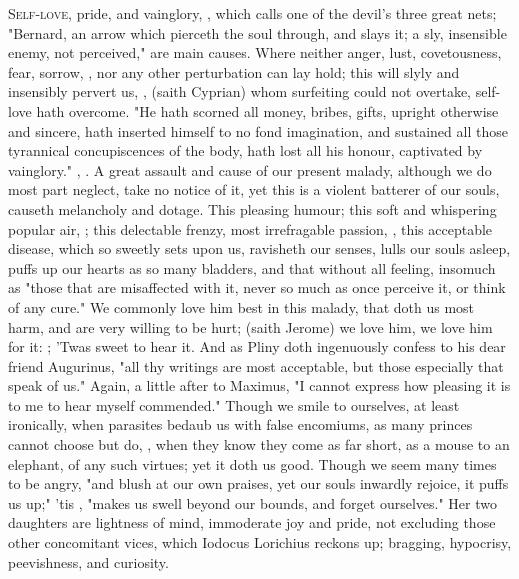 \lettrine{S}{elf-love}, pride, and vainglory, , which \Chrysostom{} calls one of the devil's three great nets;
"Bernard, an arrow which pierceth the soul through, and
slays it; a sly, insensible enemy, not perceived," are main causes. Where
neither anger, lust, covetousness, fear, sorrow, \etc{}, nor any other
perturbation can lay hold; this will slyly and insensibly pervert us, , (saith Cyprian) whom surfeiting could
not overtake, self-love hath overcome. "He hath scorned
all money, bribes, gifts, upright otherwise and sincere, hath inserted himself
to no fond imagination, and sustained all those tyrannical concupiscences of
the body, hath lost all his honour, captivated by vainglory." \Chrysostom{},
 .
A great assault and cause of our present malady, although we do most part
neglect, take no notice of it, yet this is a violent batterer of our souls,
causeth melancholy and dotage. This pleasing humour; this soft and whispering
popular air, ; this delectable frenzy, most irrefragable
passion, , this acceptable disease, which so
sweetly sets upon us, ravisheth our senses, lulls our souls asleep, puffs up
our hearts as so many bladders, and that without all feeling,
insomuch as "those that are misaffected with it, never so
much as once perceive it, or think of any cure." We commonly love him best in
this malady, that doth us most harm, and are very willing
to be hurt;  (saith
Jerome) we love him, we love him for it:
;
'Twas sweet to hear it. And as Pliny doth ingenuously
confess to his dear friend Augurinus, "all thy writings are most acceptable,
but those especially that speak of us." Again, a little after to Maximus,
"I cannot express how pleasing it is to me to hear myself
commended." Though we smile to ourselves, at least ironically, when parasites
bedaub us with false encomiums, as many princes cannot choose but do, , when they know they come as far short, as
a mouse to an elephant, of any such virtues; yet it doth us good. Though we
seem many times to be angry, "and blush at our own
praises, yet our souls inwardly rejoice, it puffs us up;" 'tis , "makes us swell beyond our bounds, and forget
ourselves." Her two daughters are lightness of mind, immoderate joy and pride,
not excluding those other concomitant vices, which Iodocus
Lorichius reckons up; bragging, hypocrisy, peevishness, and curiosity.

